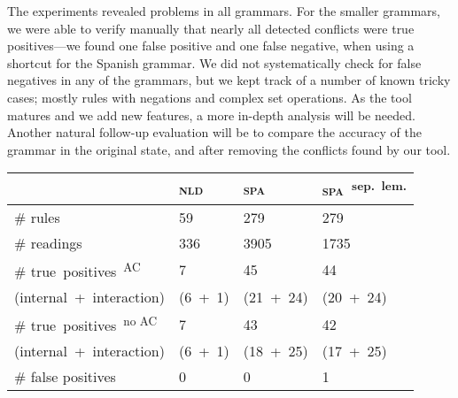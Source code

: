 {{%



The experiments revealed problems in all grammars. For the smaller
grammars, we were able to verify manually that nearly all detected conflicts were
true positives---we found one false positive and one false negative,
when using a shortcut for the Spanish grammar. 
We did not systematically check for false negatives in any of the
grammars, but we kept track of a number of known tricky cases; mostly
rules with negations and complex set operations.
As the tool matures and we add new features, a more in-depth analysis
will be needed.
Another natural follow-up evaluation will be to compare the accuracy of the
grammar in the original state, and after removing the conflicts found
by our tool. %


\begin{table}[h]
\centering
\begin{tabular}{|p{2.84cm}|p{1cm}|p{1.15cm}|p{1.55cm}|}

\hline
                   & \textsc{nld}  & \textsc{spa}  & \textsc{spa}~\textsuperscript{sep.~lem.} \\ \hline
\# rules           & 59            & 279       & 279     \\ \hline
\# readings        & 336           & 3905      & 1735    \\ \hline
\# true~positives~\textsuperscript{AC}%
                   & 7             & 45        & 44      \\ 
{\small (internal~+~interaction)}
                   & {\small
                      (6~+~1)}     & {\small 
                                    (21~+~24)} & {\small (20~+~24)} \\ \hline

\# true~positives~\textsuperscript{no AC}  & 7             & 43        & 42      \\ 
{\small (internal~+~interaction)}
                   & {\small
                      (6~+~1)}     & {\small 
                                    (18~+~25)} & {\small (17~+~25)} \\ \hline
\# false positives 
                   & 0             & 0        & 1  \\ \hline


\end{tabular}
\end{table}}}
